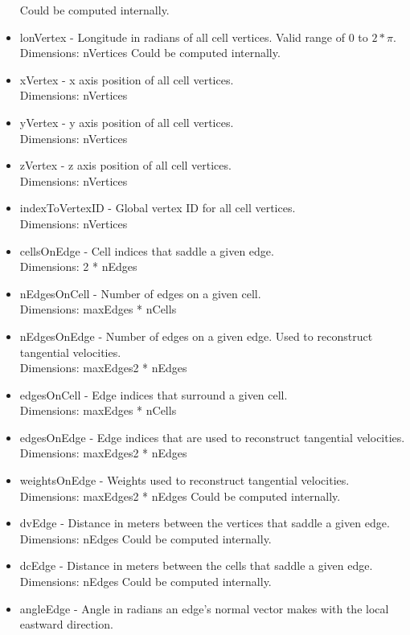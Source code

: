\documentclass[11pt]{report}
\begin{document}
\begin{itemize}
		  Could be computed internally. 
	\item lonVertex - Longitude in radians of all cell vertices. Valid range of $0$ to $2*\pi$. \\
		  Dimensions: nVertices
		  Could be computed internally. 
	\item xVertex - x axis position of all cell vertices. \\
		  Dimensions: nVertices
	\item yVertex - y axis position of all cell vertices. \\
		  Dimensions: nVertices
	\item zVertex - z axis position of all cell vertices. \\
		  Dimensions: nVertices
	\item indexToVertexID - Global vertex ID for all cell vertices. \\
		  Dimensions: nVertices
	\item cellsOnEdge - Cell indices that saddle a given edge. \\
		  Dimensions: 2 * nEdges
	\item nEdgesOnCell - Number of edges on a given cell. \\
		  Dimensions: maxEdges * nCells
	\item nEdgesOnEdge - Number of edges on a given edge. Used to reconstruct tangential velocities. \\
		  Dimensions: maxEdges2 * nEdges
	\item edgesOnCell - Edge indices that surround a given cell. \\
		  Dimensions: maxEdges * nCells
	\item edgesOnEdge - Edge indices that are used to reconstruct tangential velocities. \\
		  Dimensions: maxEdges2 * nEdges
	\item weightsOnEdge - Weights used to reconstruct tangential velocities. \\
		  Dimensions: maxEdges2 * nEdges
		  Could be computed internally. 
	\item dvEdge - Distance in meters between the vertices that saddle a given edge. \\
		  Dimensions: nEdges
		  Could be computed internally. 
	\item dcEdge - Distance in meters between the cells that saddle a given edge. \\
		  Dimensions: nEdges
		  Could be computed internally. 
	\item angleEdge - Angle in radians an edge's normal vector makes with the local eastward direction. \\

\end{itemize}
\end{document}
